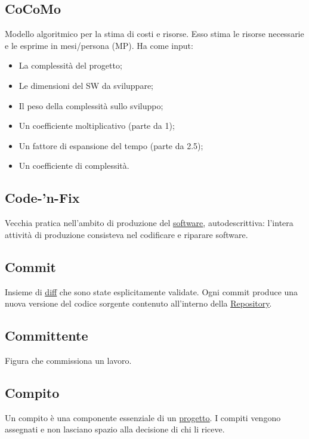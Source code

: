 	\subsection{CoCoMo}
	\label{sec:cocomo}
	Modello algoritmico per la stima di costi e risorse. Esso stima le risorse necessarie e le esprime in mesi/persona (MP). Ha come input:
	\begin{itemize}
	\item La complessità del progetto;
	\item Le dimensioni del SW da sviluppare;
	\item Il peso della complessità sullo sviluppo;
	\item Un coefficiente moltiplicativo (parte da 1);
	\item Un fattore di espansione del tempo (parte da 2.5);
	\item Un coefficiente di complessità.
	\end{itemize}


	\subsection{Code-'n-Fix}
	\label{sec:codenfix}
	Vecchia pratica nell'ambito di produzione del \underline{\hyperref[sec:prodottosoftware]{software}}, autodescrittiva: l'intera attività di produzione consisteva nel codificare e riparare software.
	\subsection{Commit}
	\label{sec:commit}
	Insieme di \underline{\hyperref[sec:diff]{diff}} che sono state esplicitamente validate. Ogni commit produce una nuova versione del codice sorgente contenuto all'interno della \underline{\hyperref[sec:repo]{Repository}}.
	
	\subsection{Committente}
	\label{sec:committente}
	Figura che commissiona un lavoro.

	\subsection{Compito}
	\label{sec:compito}
	Un compito è una componente essenziale di un \underline{\hyperref[sec:progetto]{progetto}}. I compiti vengono assegnati e non lasciano spazio alla decisione di chi li riceve.


